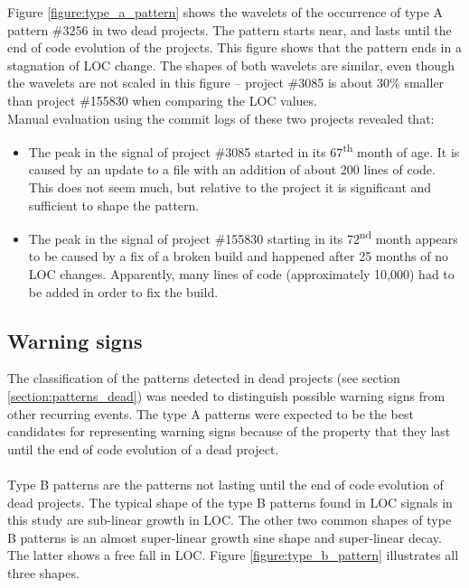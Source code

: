 

\indent
Figure \ref{figure:type_a_pattern} shows the wavelets of the occurrence of type
A pattern \#3256 in two dead projects. The pattern starts near, and lasts until
the end of code evolution of the projects. This figure shows that the pattern
ends in a stagnation of LOC change. The shapes of both wavelets are similar,
even though the wavelets are not scaled in this figure -- project \#3085 is
about 30\% smaller than project \#155830 when comparing the LOC values.\\

\noindent
Manual evaluation using the commit logs of these two projects revealed that:

\begin{itemize}
	\item The peak in the signal of project \#3085 started in its
		67\textsuperscript{th} month of age. It is caused by an update to a file
		with an addition of about 200 lines of code. This does not seem much, but
		relative to the project it is significant and sufficient to shape the
		pattern.

	\item The peak in the signal of project \#155830 starting in its
		72\textsuperscript{nd} month appears to be caused by a fix of a broken build
		and happened after 25 months of no LOC changes. Apparently, many lines of
		code (approximately 10,000) had to be added in order to fix the build.
\end{itemize}

\subsection{Warning signs}
The classification of the patterns detected in dead projects (see section
\ref{section:patterns_dead}) was needed to distinguish possible warning signs
from other recurring events. The type A patterns were expected to be the best
candidates for representing warning signs because of the property that they
last until the end of code evolution of a dead project.

\paragraph{}
Type B patterns are the patterns not lasting until the end of code evolution of
dead projects. The typical shape of the type B patterns found in LOC signals in
this study are sub-linear growth in LOC. The other two common shapes of type B
patterns is an almost super-linear growth sine shape and super-linear decay.
The latter shows a free fall in LOC. Figure \ref{figure:type_b_pattern}
illustrates all three shapes.

